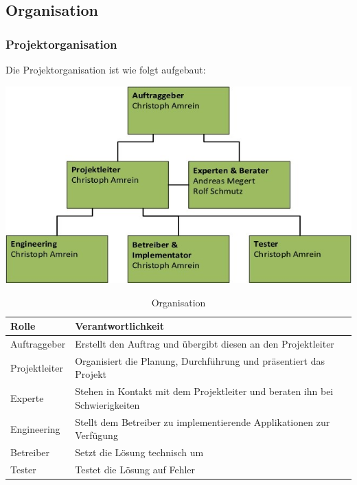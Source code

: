 \subsection{Organisation}
\subsubsection{Projektorganisation}
Die Projektorganisation ist wie folgt aufgebaut:

\includegraphics[scale=0.9]{Bilder/Projektorganisation.jpg}{\centering}

\begin{table}[H]
\centering
\begin{tabular}{p{2.5cm}p{13.5cm}}
\hline
\rowcolor{heading}\textbf{Rolle} & \textbf{Verantwortlichkeit} \\\hline
Auftraggeber & Erstellt den Auftrag und übergibt diesen an den Projektleiter \\\hline
Projektleiter & Organisiert die Planung, Durchführung und präsentiert das Projekt \\\hline
Experte & Stehen in Kontakt mit dem Projektleiter und beraten ihn bei Schwierigkeiten \\\hline
Engineering & Stellt dem Betreiber zu implementierende Applikationen zur Verfügung \\\hline
Betreiber & Setzt die Lösung technisch um \\\hline
Tester & Testet die Lösung auf Fehler  \\\hline
\end{tabular}
\caption{Organisation}
\end{table}

